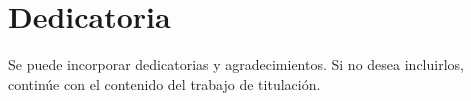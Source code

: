 \chapter*{Dedicatoria}
Se puede incorporar dedicatorias y agradecimientos. Si no desea incluirlos, continúe
con el contenido del trabajo de titulación.
